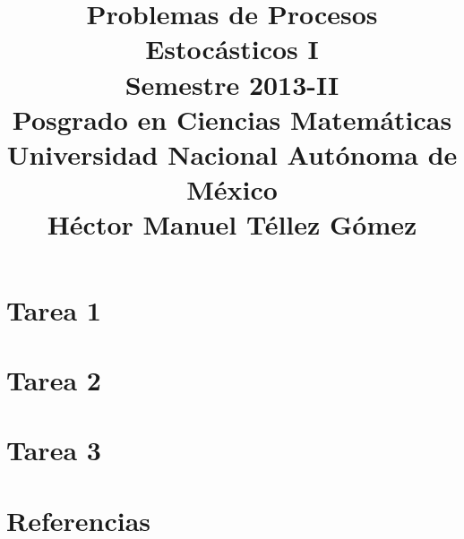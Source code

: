 \documentclass[a5paper,oneside]{amsart}
\title[Problemas de Procesos I]{
    Problemas de Procesos Estocásticos I\\ 
    Semestre 2013-II\\ 
    Posgrado en Ciencias Matemáticas\\ 
    Universidad Nacional Autónoma de México\\
    Héctor Manuel Téllez Gómez
}
\theoremstyle{dotless}
\numberwithin{section}{part}
\numberwithin{equation}{subsection}
\begin{document}
    \maketitle
    \part{Tarea 1}
        
        
        \nqed
        
    \part{Tarea 2}
        
        
        \nqed
        
    \part{Tarea 3}
        
        
        \nqed
        
    \part*{Referencias}
    
    
\end{document}
